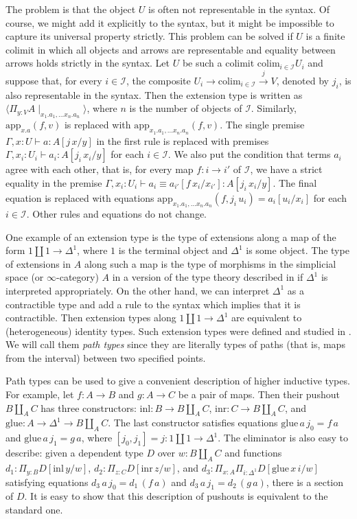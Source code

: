 \documentclass[reqno]{amsart}
\theoremstyle{definition}
\theoremstyle{remark}
\newcommand{\fs}[1]{\mathrm{#1}}
\newcommand{\scat}[1]{\mathcal{#1}}
\numberwithin{figure}{section}
\begin{document}
The problem is that the object $U$ is often not representable in the syntax.
Of course, we might add it explicitly to the syntax, but it might be impossible to capture its universal property strictly.
This problem can be solved if $U$ is a finite colimit in which all objects and arrows are representable and equality between arrows holds strictly in the syntax.
Let $U$ be such a colimit $\fs{colim}_{i \in \scat{I}} U_i$ and suppose that, for every $i \in \scat{I}$, the composite $U_i \to \fs{colim}_{i \in \scat{I}} \xrightarrow{j} V$, denoted by $j_i$, is also representable in the syntax.
Then the extension type is written as $\langle \Pi_{y : V} A \mid_{x_1.a_1, \ldots x_n.a_n} \rangle$, where $n$ is the number of objects of $\scat{I}$.
Similarly, $\fs{app}_{x.a}(f,v)$ is replaced with $\fs{app}_{x_1.a_1, \ldots x_n.a_n}(f,v)$.
The single premise $\Gamma, x : U \vdash a : A[j\,x/y]$ in the first rule is replaced with premises $\Gamma, x_i : U_i \vdash a_i : A[j_i\,x_i/y]$ for each $i \in \scat{I}$.
We also put the condition that terms $a_i$ agree with each other, that is, for every map $f : i \to i'$ of $\scat{I}$, we have a strict equality in the premise $\Gamma, x_i : U_i \vdash a_i \equiv a_{i'}[f\,x_i/x_{i'}] : A[j_i\,x_i/y]$.
The final equation is replaced with equations $\fs{app}_{x_1.a_1, \ldots x_n.a_n}(f,j_i\,u_i) = a_i[u_i/x_i]$ for each $i \in \scat{I}$.
Other rules and equations do not change.

One example of an extension type is the type of extensions along a map of the form $1 \amalg 1 \to \Delta^1$, where $1$ is the terminal object and $\Delta^1$ is some object.
The type of extensions in $A$ along such a map is the type of morphisms in the simplicial space (or $\infty$-category) $A$ in a version of the type theory described in \cite{riehl-dhott} if $\Delta^1$ is interpreted appropriately.
On the other hand, we can interpret $\Delta^1$ as a contractible type and add a rule to the syntax which implies that it is contractible.
Then extension types along $1 \amalg 1 \to \Delta^1$ are equivalent to (heterogeneous) identity types.
Such extension types were defined and studied in \cite[Subsection~3.2]{alg-models}.
We will call them \emph{path types} since they are literally types of paths (that is, maps from the interval) between two specified points.

Path types can be used to give a convenient description of higher inductive types.
For example, let $f : A \to B$ and $g : A \to C$ be a pair of maps.
Then their pushout $B \amalg_A C$ has three constructors: $\fs{inl} : B \to B \amalg_A C$, $\fs{inr} : C \to B \amalg_A C$, and $\fs{glue} : A \to \Delta^1 \to B \amalg_A C$.
The last constructor satisfies equations $\fs{glue}\,a\,j_0 = f\,a$ and $\fs{glue}\,a\,j_1 = g\,a$, where $[j_0,j_1] = j : 1 \amalg 1 \to \Delta^1$.
The eliminator is also easy to describe:
given a dependent type $D$ over $w : B \amalg_A C$ and functions $d_1 : \Pi_{y : B} D[\fs{inl}\,y/w]$, $d_2 : \Pi_{z : C} D[\fs{inr}\,z/w]$,
and $d_3 : \Pi_{x : A} \Pi_{i : \Delta^1} D[\fs{glue}\,x\,i/w]$ satisfying equations $d_3\,a\,j_0 = d_1\,(f\,a)$ and $d_3\,a\,j_1 = d_2\,(g\,a)$,
there is a section of $D$.
It is easy to show that this description of pushouts is equivalent to the standard one.
\end{document}
